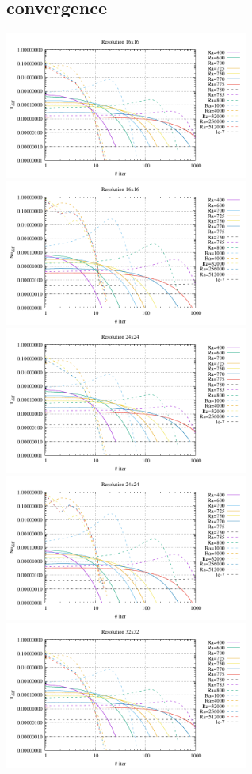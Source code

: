 \subsection*{convergence}
\begin{center}
\includegraphics[width=8cm]{python_codes/md/results_new/conv_16x16_T.pdf}
\includegraphics[width=8cm]{python_codes/md/results_new/conv_16x16_Nu.pdf}\\
\includegraphics[width=8cm]{python_codes/md/results_new/conv_24x24_T.pdf}
\includegraphics[width=8cm]{python_codes/md/results_new/conv_24x24_Nu.pdf}\\
\includegraphics[width=8cm]{python_codes/md/results_new/conv_32x32_T.pdf}

\end{center}
